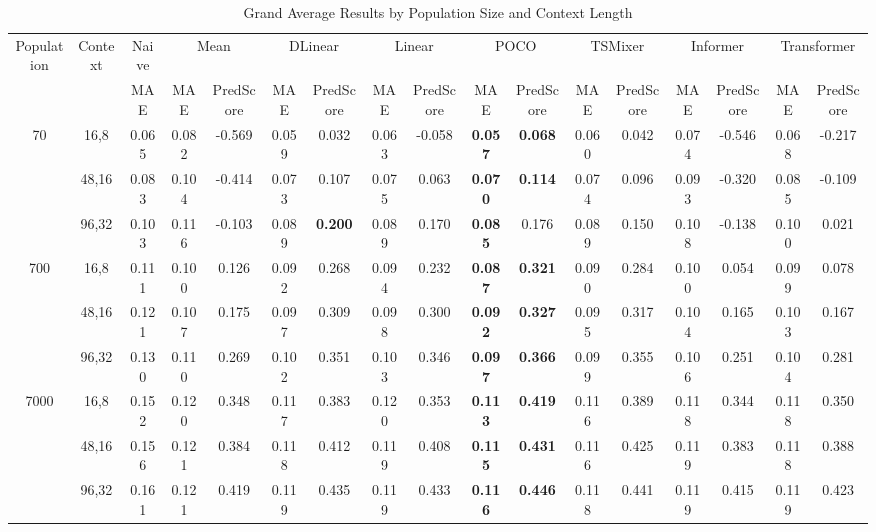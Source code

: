 \begin{table}[h!]
\centering
\caption{Grand Average Results by Population Size and Context Length}
\label{tab:grand_average_results}
\begin{tabular}{|c|c|c|c|c|c|c|c|c|c|c|c|c|c|c|c|c|}
\hline
\multirow{2}{*}{Population} & \multirow{2}{*}{Context} & {Naive} & \multicolumn{2}{c|}{Mean} & \multicolumn{2}{c|}{DLinear} & \multicolumn{2}{c|}{Linear} & \multicolumn{2}{c|}{POCO} & \multicolumn{2}{c|}{TSMixer} & \multicolumn{2}{c|}{Informer} & \multicolumn{2}{c|}{Transformer} \\
 & & MAE & MAE & PredScore & MAE & PredScore & MAE & PredScore & MAE & PredScore & MAE & PredScore & MAE & PredScore & MAE & PredScore \\
\hline
\multirow{3}{*}{70} & 16,8 & 0.065 & 0.082 & -0.569 & 0.059 & 0.032 & 0.063 & -0.058 & \textbf{0.057} & \textbf{0.068} & 0.060 & 0.042 & 0.074 & -0.546 & 0.068 & -0.217 \\
 & 48,16 & 0.083 & 0.104 & -0.414 & 0.073 & 0.107 & 0.075 & 0.063 & \textbf{0.070} & \textbf{0.114} & 0.074 & 0.096 & 0.093 & -0.320 & 0.085 & -0.109 \\
 & 96,32 & 0.103 & 0.116 & -0.103 & 0.089 & \textbf{0.200} & 0.089 & 0.170 & \textbf{0.085} & 0.176 & 0.089 & 0.150 & 0.108 & -0.138 & 0.100 & 0.021 \\
\hline
\multirow{3}{*}{700} & 16,8 & 0.111 & 0.100 & 0.126 & 0.092 & 0.268 & 0.094 & 0.232 & \textbf{0.087} & \textbf{0.321} & 0.090 & 0.284 & 0.100 & 0.054 & 0.099 & 0.078 \\
 & 48,16 & 0.121 & 0.107 & 0.175 & 0.097 & 0.309 & 0.098 & 0.300 & \textbf{0.092} & \textbf{0.327} & 0.095 & 0.317 & 0.104 & 0.165 & 0.103 & 0.167 \\
 & 96,32 & 0.130 & 0.110 & 0.269 & 0.102 & 0.351 & 0.103 & 0.346 & \textbf{0.097} & \textbf{0.366} & 0.099 & 0.355 & 0.106 & 0.251 & 0.104 & 0.281 \\
\hline
\multirow{3}{*}{7000} & 16,8 & 0.152 & 0.120 & 0.348 & 0.117 & 0.383 & 0.120 & 0.353 & \textbf{0.113} & \textbf{0.419} & 0.116 & 0.389 & 0.118 & 0.344 & 0.118 & 0.350 \\
 & 48,16 & 0.156 & 0.121 & 0.384 & 0.118 & 0.412 & 0.119 & 0.408 & \textbf{0.115} & \textbf{0.431} & 0.116 & 0.425 & 0.119 & 0.383 & 0.118 & 0.388 \\
 & 96,32 & 0.161 & 0.121 & 0.419 & 0.119 & 0.435 & 0.119 & 0.433 & \textbf{0.116} & \textbf{0.446} & 0.118 & 0.441 & 0.119 & 0.415 & 0.119 & 0.423 \\
\hline
\end{tabular}
\end{table}